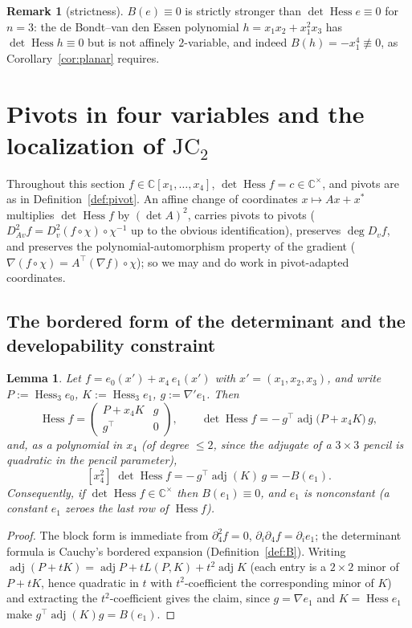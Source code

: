 \documentclass[11pt]{article}
\theoremstyle{plain}
\newtheorem{lemma}[theorem]{Lemma}
\theoremstyle{definition}
\newtheorem{remark}[theorem]{Remark}
\newcommand{\C}{\mathbb{C}}
\newcommand{\Hess}{\operatorname{Hess}}
\newcommand{\adj}{\operatorname{adj}}
\newcommand{\JC}{\mathrm{JC}}
\begin{document}
\begin{remark}[strictness]\label{rem:strict}
$B(e)\equiv0$ is strictly stronger than $\det\Hess e\equiv0$ for $n=3$:
the de Bondt--van den Essen polynomial $h=x_1x_2+x_1^2x_3$ has
$\det\Hess h\equiv0$ but is not affinely $2$-variable, and indeed
$B(h)=-x_1^4\not\equiv0$, as Corollary~\ref{cor:planar} requires.
\end{remark}

\section{Pivots in four variables and the localization of
$\JC_2$}\label{sec:pivot}

Throughout this section $f\in\C[x_1,\dots,x_4]$,
$\det\Hess f=c\in\C^{\times}$, and pivots are as in
Definition~\ref{def:pivot}. An affine change of coordinates
$x\mapsto Ax+x^{\ast}$ multiplies $\det\Hess f$ by $(\det A)^2$, carries
pivots to pivots ($D_{Av}^2f=D_v^2(f\circ\chi)\circ\chi^{-1}$ up to the
obvious identification), preserves $\deg D_vf$, and preserves the
polynomial-automorphism property of the gradient
($\nabla(f\circ\chi)=A^{\top}(\nabla f)\circ\chi$); so we may and do work
in pivot-adapted coordinates.

\subsection{The bordered form of the determinant and the developability
constraint}

\begin{lemma}\label{lem:bordered}
Let $f=e_0(x')+x_4\,e_1(x')$ with $x'=(x_1,x_2,x_3)$, and write
$P:=\Hess_3e_0$, $K:=\Hess_3e_1$, $g:=\nabla'e_1$. Then
\[
\Hess f=\begin{pmatrix}P+x_4K&g\\ g^{\top}&0\end{pmatrix},
\qquad
\det\Hess f=-\,g^{\top}\adj\bigl(P+x_4K\bigr)\,g ,
\]
and, as a polynomial in $x_4$ (of degree $\le2$, since the adjugate of a
$3\times3$ pencil is quadratic in the pencil parameter),
\[
[x_4^2]\;\det\Hess f=-\,g^{\top}\adj(K)\,g=-B(e_1).
\]
Consequently, if $\det\Hess f\in\C^{\times}$ then $B(e_1)\equiv0$, and
$e_1$ is nonconstant (a constant $e_1$ zeroes the last row of $\Hess f$).
\end{lemma}

\begin{proof}
The block form is immediate from $\partial_4^2f=0$,
$\partial_i\partial_4f=\partial_ie_1$; the determinant formula is
Cauchy's bordered expansion (Definition~\ref{def:B}). Writing
$\adj(P+tK)=\adj P+tL(P,K)+t^2\adj K$ (each entry is a $2\times2$ minor
of $P+tK$, hence quadratic in $t$ with $t^2$-coefficient the
corresponding minor of $K$) and extracting the $t^2$-coefficient gives
the claim, since $g=\nabla e_1$ and $K=\Hess e_1$ make
$g^{\top}\adj(K)g=B(e_1)$.
\end{proof}
\end{document}
